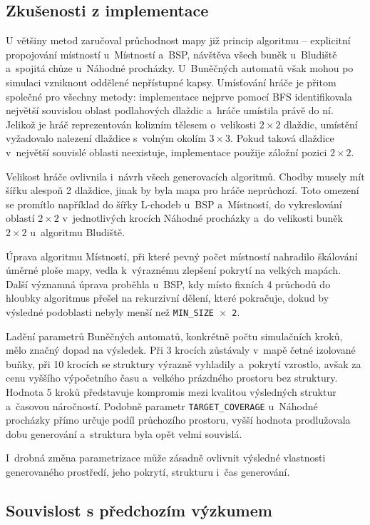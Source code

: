 \documentclass[
   program=itk,
   biblatex,
   figures=true,
   tables=true,
   glossaries,
   index
]{kidiplom}
\begin{document}
\subsection{Zkušenosti z implementace}

U většiny metod zaručoval průchodnost mapy již princip algoritmu -- explicitní propojování místností u~Místností a~BSP, návštěva všech buněk u~Bludiště a~spojitá chůze u~Náhodné procházky. U~Buněčných automatů však mohou po simulaci vzniknout oddělené nepřístupné kapsy. Umísťování hráče je přitom společné pro všechny metody: implementace nejprve pomocí BFS identifikovala největší souvislou oblast podlahových dlaždic a~hráče umístila právě do ní. Jelikož je hráč reprezentován kolizním tělesem o~velikosti $2 \times 2$ dlaždic, umístění vyžadovalo nalezení dlaždice s~volným okolím $3 \times 3$. Pokud taková dlaždice v~největší souvislé oblasti neexistuje, implementace použije záložní pozici $2 \times 2$.

Velikost hráče ovlivnila i~návrh všech generovacích algoritmů. Chodby musely mít šířku alespoň 2 dlaždice, jinak by byla mapa pro hráče neprůchozí. Toto omezení se promítlo například do šířky L-chodeb u~BSP a~Místností, do vykreslování oblastí $2 \times 2$ v~jednotlivých krocích Náhodné procházky a~do velikosti buněk $2 \times 2$ u~algoritmu Bludiště.

Úprava algoritmu Místností, při které pevný počet místností nahradilo škálování úměrné ploše mapy, vedla k~výraznému zlepšení pokrytí na velkých mapách. Další významná úprava proběhla u~BSP, kdy místo fixních 4 průchodů do hloubky algoritmus přešel na rekurzivní dělení, které pokračuje, dokud by výsledné podoblasti nebyly menší než \texttt{MIN\_SIZE~$\times$~2}.

Ladění parametrů Buněčných automatů, konkrétně počtu simulačních kroků, mělo značný dopad na výsledek. Při 3 krocích zůstávaly v~mapě četné izolované buňky, při 10 krocích se struktury výrazně vyhladily a~pokrytí vzrostlo, avšak za cenu vyššího výpočetního času a~velkého prázdného prostoru bez struktury. Hodnota 5 kroků představuje kompromis mezi kvalitou výsledných struktur a~časovou náročností. Podobně parametr \texttt{TARGET\_COVERAGE} u~Náhodné procházky přímo určuje podíl průchozího prostoru, vyšší hodnota prodlužovala dobu generování a~struktura byla opět velmi souvislá.

I~drobná změna parametrizace může zásadně ovlivnit výsledné vlastnosti generovaného prostředí, jeho pokrytí, strukturu i~čas generování.

\subsection{Souvislost s předchozím výzkumem}
\end{document}
